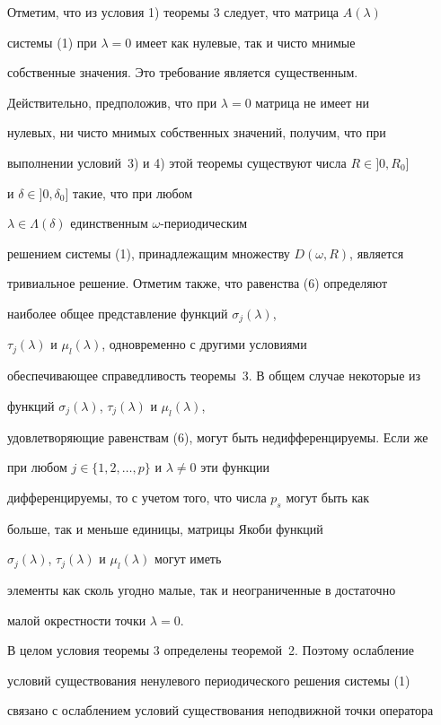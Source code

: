Отметим, что из условия 1) теоремы 3 следует, что матрица $A(\lambda)$ 


системы (1) при $\lambda=0$ имеет как нулевые, так и чисто мнимые 


собственные значения. Это требование является существенным. 


Действительно, предположив, что при $\lambda=0$ матрица не имеет ни 


нулевых, ни чисто мнимых собственных значений, получим, что при 


выполнении условий~3) и 4) этой теоремы существуют числа $R\in]0,R_0]$ 


и $\delta\in]0,\delta_0]$ такие, что при любом 


$\lambda\in\Lambda(\delta)$ единственным $\omega$-периодическим 


решением системы (1), принадлежащим множеству $D(\omega,R)$, является 


тривиальное решение. Отметим также, что равенства (6) определяют 


наиболее общее представление функций $\sigma_j(\lambda)$, 


$\tau_j(\lambda)$ и $\mu_l(\lambda)$, одновременно с другими условиями 


обеспечивающее справедливость теоремы~3. В общем случае некоторые из 


функций $\sigma_j(\lambda)$, $\tau_j(\lambda)$ и $\mu_l(\lambda)$, 


удовлетворяющие равенствам (6), могут быть недифференцируемы. Если же 


при любом $j\in\{1,2,\dotsc,p\}$ и $\lambda\ne0$ эти функции 


дифференцируемы, то с учетом того, что числа $p_s$ могут быть как 


больше, так и меньше единицы, матрицы Якоби функций 


$\sigma_j(\lambda)$, $\tau_j(\lambda)$ и $\mu_l(\lambda)$ могут иметь 


элементы как сколь угодно малые, так и неограниченные в достаточно 


малой окрестности точки $\lambda=0$. 


 


В целом условия теоремы 3 определены теоремой~2. Поэтому ослабление 


условий существования ненулевого периодического решения системы (1) 


связано с ослаблением условий существования неподвижной точки оператора 



